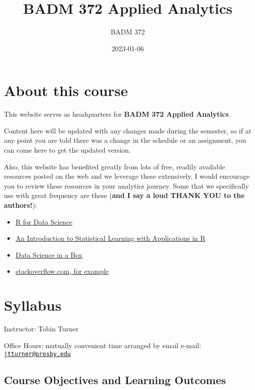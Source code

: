 \documentclass[
]{book}
\title{BADM 372 Applied Analytics}
\author{BADM 372}
\date{2023-01-06}
\providecommand{\tightlist}{%
  \setlength{\itemsep}{0pt}\setlength{\parskip}{0pt}}
\begin{document}
\maketitle

{
\setcounter{tocdepth}{1}
\tableofcontents
}
\hypertarget{about-this-course}{%
\chapter{About this course}\label{about-this-course}}

This website serves as headquarters for \textbf{BADM 372 Applied Analytics}.

Content here will be updated with any changes made during the semester, so if at any point you are told there was a change in the schedule or an assignment, you can come here to get the updated version.

Also, this website has benefited greatly from lots of free, readily available resources posted on the web and we leverage these extensively. I would encourage you to review these resources in your analytics journey. Some that we specifically use with great frequency are these (\textbf{and I say a loud THANK YOU to the authors!}):

\begin{itemize}
\tightlist
\item
  \href{https://r4ds.had.co.nz/}{R for Data Science}
\item
  \href{https://trevorhastie.github.io/ISLR/}{An Introduction to Statistical Learning with Applications in R}
\item
  \href{https://datasciencebox.org/}{Data Science in a Box}
\item
  \href{https://stackoverflow.com/questions/4862178/remove-rows-with-all-or-some-nas-missing-values-in-data-frame?rq=1}{stackoverflow.com, for example}
\end{itemize}

\hypertarget{syllabus}{%
\chapter{Syllabus}\label{syllabus}}

Instructor: Tobin Turner

Office Hours: mutually convenient time arranged by email e-mail: \href{mailto:jtturner@presby.edu}{\nolinkurl{jtturner@presby.edu}}

\hypertarget{course-objectives-and-learning-outcomes}{%
\section{Course Objectives and Learning Outcomes}\label{course-objectives-and-learning-outcomes}}
\end{document}
